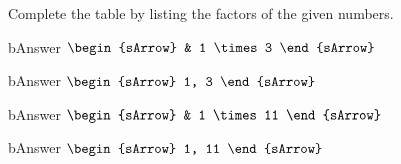\clearpage\noindent
\begin{mtask}[resume]
\task Complete the table by listing the factors of the given numbers.
    \begin{tcbraster}[raster column skip=-0.2pt,
					  colback=white,
					  sharp corners,
					  boxrule=0.3pt,
					  after skip=-0.1pt,
					  raster row skip=-0.1pt,
					  raster height=6cm,
    				  ]
	\begin{tcolorbox}
	    \begin{envCell}{bAnswer}
			 $\begin{sArrow}
                      & 1  \times 3            
				  \end{sArrow}$	
	    \end{envCell}
    \end{tcolorbox}
    \begin{tcolorbox}
	    \begin{envCell}{bAnswer}
			 $\begin{sArrow}
 			          1, 3           
				  \end{sArrow}$	
	    \end{envCell}
    \end{tcolorbox}
	\begin{tcolorbox}
	    \begin{envCell}{bAnswer}
			 $\begin{sArrow}
                      & 1  \times 11            
				  \end{sArrow}$	
	    \end{envCell}
    \end{tcolorbox}
    \begin{tcolorbox}
	    \begin{envCell}{bAnswer}
			 $\begin{sArrow}
 			          1, 11           
				  \end{sArrow}$	
	    \end{envCell}
    \end{tcolorbox}
\end{tcbraster}
\end{mtask}


